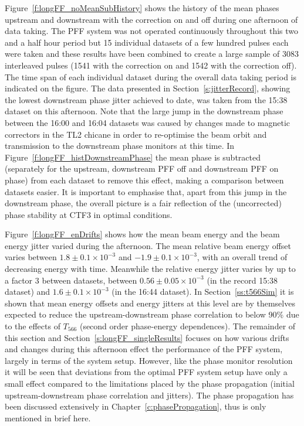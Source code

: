 Figure~\ref{f:longFF_noMeanSubHistory} shows the history of the mean phases upstream and downstream with the correction on and off during one afternoon of data taking. The PFF system was not operated continuously throughout this two and a half hour period but 15 individual datasets of a few hundred pulses each were taken and these results have been combined to create a large sample of 3083 interleaved pulses (1541 with the correction on and 1542 with the correction off). The time span of each individual dataset during the overall data taking period is indicated on the figure. The data presented in Section~\ref{s:jitterRecord}, showing the lowest downstream phase jitter achieved to date, was taken from the 15:38 dataset on this afternoon. Note that the large jump in the downstream phase between the 16:00 and 16:04 datasets was caused by changes made to magnetic correctors in the TL2 chicane in order to re-optimise the beam orbit and transmission to the downstream phase monitors at this time. In Figure~\ref{f:longFF_histDownstreamPhase} the mean phase is subtracted (separately for the upstream, downstream PFF off and downstream PFF on phase) from each dataset to remove this effect, making a comparison between datasets easier. It is important to emphasise that, apart from this jump in the downstream phase, the overall picture is a fair reflection of the (uncorrected) phase stability at CTF3 in optimal conditions.

Figure~\ref{f:longFF_enDrifts} shows how the mean beam energy and the beam energy jitter varied during the afternoon. The mean relative beam energy offset varies between \(1.8\pm0.1\times10^{-3}\) and \(-1.9\pm0.1\times10^{-3}\), with an overall trend of decreasing energy with time. Meanwhile the relative energy jitter varies by up to a factor 3 between datasets, between \(0.56\pm0.05\times10^{-3}\) (in the record 15:38 dataset) and \(1.6\pm0.1\times10^{-3}\) (in the 16:44 dataset). In Section~\ref{ss:t566Sim} it is shown that mean energy offsets and energy jitters at this level are by themselves expected to reduce the upstream-downstream phase correlation to below 90\% due to the effects of \(T_{566}\) (second order phase-energy dependences). The remainder of this section and Section~\ref{s:longFF_singleResults} focuses on how various drifts and changes during this afternoon effect the performance of the PFF system, largely in terms of the system setup. However, like the phase monitor resolution it will be seen that deviations from the optimal PFF system setup have only a small effect compared to the limitations placed by the phase propagation (initial upstream-downstream phase correlation and jitters). The phase propagation has been discussed extensively in Chapter~\ref{c:phasePropagation}, thus is only mentioned in brief here.

